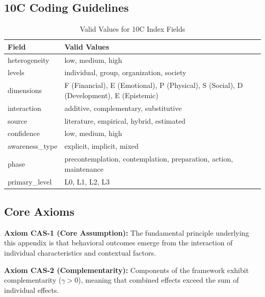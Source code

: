 \subsection{10C Coding Guidelines}

\begin{table}[h]
\centering
\begin{tabular}{lp{8cm}}
\toprule
\textbf{Field} & \textbf{Valid Values} \\
\midrule
heterogeneity & low, medium, high \\
levels & individual, group, organization, society \\
dimensions & F (Financial), E (Emotional), P (Physical), S (Social), D (Development), E (Epistemic) \\
interaction & additive, complementary, substitutive \\
source & literature, empirical, hybrid, estimated \\
confidence & low, medium, high \\
awareness\_type & explicit, implicit, mixed \\
phase & precontemplation, contemplation, preparation, action, maintenance \\
primary\_level & L0, L1, L2, L3 \\
\bottomrule
\end{tabular}
\caption{Valid Values for 10C Index Fields}
\end{table}


\subsection{Core Axioms}
\label{sec:cas-axioms}

\begin{tcolorbox}[colback=yellow!5!white,colframe=yellow!75!black,title=Axiom CAS-1: Fundamental Principle]
\textbf{Axiom CAS-1 (Core Assumption):}
The fundamental principle underlying this appendix is that behavioral outcomes
emerge from the interaction of individual characteristics and contextual factors.
\end{tcolorbox}

\begin{tcolorbox}[colback=yellow!5!white,colframe=yellow!75!black,title=Axiom CAS-2: Complementarity]
\textbf{Axiom CAS-2 (Complementarity):}
Components of the framework exhibit complementarity ($\gamma > 0$), meaning
that combined effects exceed the sum of individual effects.
\end{tcolorbox}




